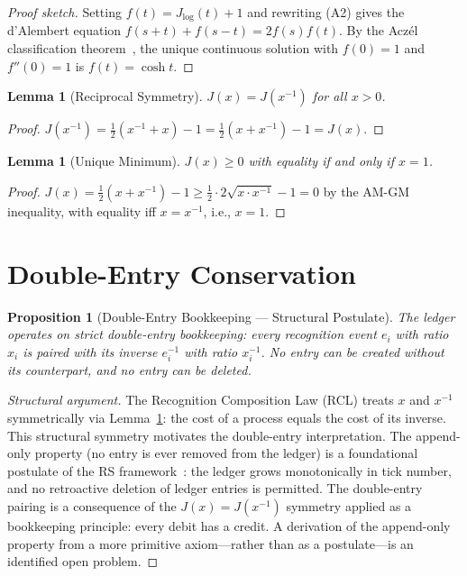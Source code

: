 \documentclass[12pt,a4paper]{article}
\newtheorem{lemma}[theorem]{Lemma}
\newtheorem{proposition}[theorem]{Proposition}
\theoremstyle{definition}
\theoremstyle{remark}
\begin{document}
\begin{proof}[Proof sketch]
Setting $f(t) = J_{\log}(t) + 1$ and rewriting \textup{(A2)} gives
the d'Alembert equation $f(s+t) + f(s-t) = 2f(s)f(t)$.  By the
Acz\'el classification theorem~\cite{Aczel1966}, the unique continuous
solution with $f(0) = 1$ and $f''(0) = 1$ is $f(t) = \cosh t$.
\end{proof}

\begin{lemma}[Reciprocal Symmetry]
\label{lem:reciprocal}
$J(x) = J(x^{-1})$ for all $x > 0$.
\end{lemma}

\begin{proof}
$J(x^{-1}) = \tfrac{1}{2}(x^{-1} + x) - 1
= \tfrac{1}{2}(x + x^{-1}) - 1 = J(x)$.
\end{proof}

\begin{lemma}[Unique Minimum]
\label{lem:minimum}
$J(x) \geq 0$ with equality if and only if $x = 1$.
\end{lemma}

\begin{proof}
$J(x) = \tfrac{1}{2}(x + x^{-1}) - 1
\geq \tfrac{1}{2} \cdot 2\sqrt{x \cdot x^{-1}} - 1 = 0$
by the AM-GM inequality, with equality iff $x = x^{-1}$,
i.e., $x = 1$.
\end{proof}

\section{Double-Entry Conservation}
\label{sec:double-entry}

\begin{proposition}[Double-Entry Bookkeeping --- Structural Postulate]
\label{thm:double-entry}
The ledger operates on strict double-entry bookkeeping: every
recognition event $e_i$ with ratio $x_i$ is paired with its
inverse $e_i^{-1}$ with ratio $x_i^{-1}$.  No entry can be
created without its counterpart, and no entry can be deleted.
\end{proposition}

\begin{proof}[Structural argument]
The Recognition Composition Law (RCL) treats $x$ and $x^{-1}$
symmetrically via Lemma~\ref{lem:reciprocal}: the cost of a
process equals the cost of its inverse.
This structural symmetry motivates the double-entry interpretation.
The append-only property (no entry is ever removed from the ledger)
is a foundational postulate of the RS framework~\cite{RS_Axioms}:
the ledger grows monotonically in tick number, and no retroactive
deletion of ledger entries is permitted.  The double-entry pairing
is a consequence of the $J(x) = J(x^{-1})$ symmetry applied as a
bookkeeping principle: every debit has a credit.  A derivation of
the append-only property from a more primitive axiom---rather than
as a postulate---is an identified open problem.
\end{proof}
\end{document}
